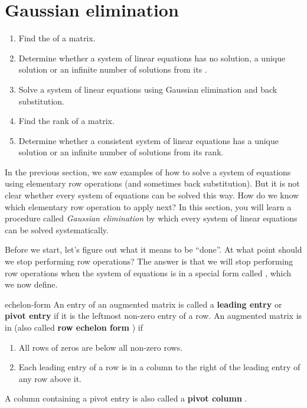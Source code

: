 \section{Gaussian elimination}
\label{sec:gaussian-elimination}

\begin{outcome}
  \begin{enumerate}
  \item Find the {\ef} of a matrix.
  \item Determine whether a system of linear equations has no
    solution, a unique solution or an infinite number of solutions
    from its {\ef}.
  \item Solve a system of linear equations using Gaussian elimination
    and back substitution.
  \item Find the rank of a matrix.
  \item Determine whether a consistent system of linear equations has
    a unique solution or an infinite number of solutions from its
    rank.
  \end{enumerate}
\end{outcome}

In the previous section, we saw examples of how to solve a system of
equations using elementary row operations (and sometimes back
substitution). But it is not clear whether every system of equations
can be solved this way. How do we know which elementary row operation
to apply next? In this section, you will learn a procedure called {\em
  Gaussian elimination} by which every system of linear equations can
be solved systematically.

Before we start, let's figure out what it means to be ``done''. At
what point should we stop performing row operations? The answer is
that we will stop performing row operations when the system of
equations is in a special form called {\em {\ef}}, which we now define.

\begin{definition}{\Ef}{echelon-form}
  An entry of an augmented matrix is called a \textbf{leading entry}%
   or \textbf{pivot entry}%
   if it is the leftmost non-zero entry of a row.
  An augmented matrix is in \textbf{\ef}%
  \eindex{\ef} (also called \textbf{row echelon form}%
  ) if
  \begin{enumerate}
  \item All rows of zeros are below all non-zero rows.

  \item Each leading entry of a row is in a column to the right of the
    leading entry of any row above it.
  \end{enumerate}
  A column containing a pivot entry is also called a \textbf{pivot
    column}%
  .
\end{definition}


